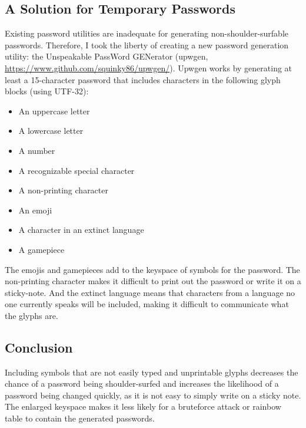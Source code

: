 \subsection{A Solution for Temporary Passwords}

Existing password utilities are inadequate for generating non-shoulder-surfable passwords. Therefore, I took the liberty of creating a new password generation utility: the Unspeakable PassWord GENerator (upwgen, \url{https://www.github.com/squinky86/upwgen/}). Upwgen works by generating at least a 15-character password\autocite[SV-222536r508029\_rule]{20210816:ASDStig} that includes characters in the following glyph blocks (using UTF-32):
\begin{itemize}
	\item An uppercase letter\autocite[SV-222537r508029\_rule]{20210816:ASDStig}
	\item A lowercase letter\autocite[SV-222538r508029\_rule]{20210816:ASDStig}
	\item A number\autocite[SV-222539r508029\_rule]{20210816:ASDStig}
	\item A recognizable special character\autocite[SV-222540r508029\_rule]{20210816:ASDStig}
	\item A non-printing character
	\item An emoji
	\item A character in an extinct language
	\item A gamepiece
\end{itemize}

The emojis and gamepieces add to the keyspace of symbols for the password. The non-printing character makes it difficult to print out the password or write it on a sticky-note. And the extinct language means that characters from a language no one currently speaks will be included, making it difficult to communicate what the glyphs are.

\subsection{Conclusion}

Including symbols that are not easily typed and unprintable glyphs decreases the chance of a password being shoulder-surfed and increases the likelihood of a password being changed quickly, as it is not easy to simply write on a sticky note. The enlarged keyspace makes it less likely for a bruteforce attack or rainbow table to contain the generated passwords.
